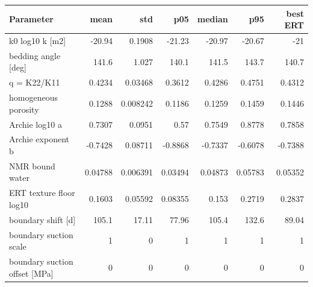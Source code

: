 \begin{tabular}{lrrrrrr}
\toprule
Parameter & mean & std & p05 & median & p95 & best ERT \\
\midrule
k0 log10 k [m2] & -20.94 & 0.1908 & -21.23 & -20.97 & -20.67 & -21 \\
bedding angle [deg] & 141.6 & 1.027 & 140.1 & 141.5 & 143.7 & 140.7 \\
q = K22/K11 & 0.4234 & 0.03468 & 0.3612 & 0.4286 & 0.4751 & 0.4312 \\
homogeneous porosity & 0.1288 & 0.008242 & 0.1186 & 0.1259 & 0.1459 & 0.1446 \\
Archie log10 a & 0.7307 & 0.0951 & 0.57 & 0.7549 & 0.8778 & 0.7858 \\
Archie exponent b & -0.7428 & 0.08711 & -0.8868 & -0.7337 & -0.6078 & -0.7388 \\
NMR bound water & 0.04788 & 0.006391 & 0.03494 & 0.04873 & 0.05783 & 0.05352 \\
ERT texture floor log10 & 0.1603 & 0.05592 & 0.08355 & 0.153 & 0.2719 & 0.2837 \\
boundary shift [d] & 105.1 & 17.11 & 77.96 & 105.4 & 132.6 & 89.04 \\
boundary suction scale & 1 & 0 & 1 & 1 & 1 & 1 \\
boundary suction offset [MPa] & 0 & 0 & 0 & 0 & 0 & 0 \\
\bottomrule
\end{tabular}
